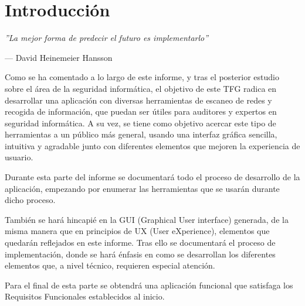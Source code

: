 \chapter{Introducción}

\epigraph{\textit{''La mejor forma de predecir el futuro es implementarlo''}}{--- David Heinemeier Hansson}

Como se ha comentado a lo largo de este informe, y tras el posterior estudio sobre el área de la seguridad informática, el objetivo de este TFG radica en desarrollar una aplicación con diversas herramientas de escaneo de redes y recogida de información, que puedan ser útiles para auditores y expertos en seguridad informática. A su vez, se tiene como objetivo acercar este tipo de herramientas a un público más general, usando una interfaz gráfica sencilla, intuitiva y agradable junto con diferentes elementos que mejoren la experiencia de usuario.

Durante esta parte del informe se documentará todo el proceso de desarrollo de la aplicación, empezando por enumerar las herramientas que se usarán durante dicho proceso.

También se hará hincapié en la GUI (Graphical User interface) generada, de la misma manera que en principios de UX (User eXperience), elementos que quedarán reflejados en este informe. Tras ello se documentará el proceso de implementación, donde se hará énfasis en como se desarrollan los diferentes elementos que, a nivel técnico, requieren especial atención.

Para el final de esta parte se obtendrá una aplicación funcional que satisfaga los Requisitos Funcionales establecidos al inicio.

